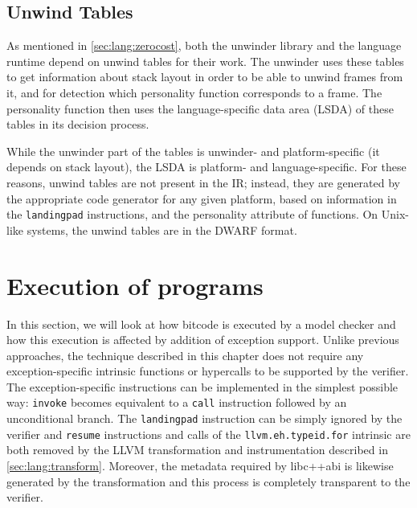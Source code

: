 \subsection{Unwind Tables}\label{sec:lang:unwind-tables}

As mentioned in \autoref{sec:lang:zerocost}, both the unwinder library
and the language runtime depend on unwind tables for their work. The
unwinder uses these tables to get information about stack layout in
order to be able to unwind frames from it, and for detection which
personality function corresponds to a frame. The personality function
then uses the language-specific data area (LSDA) of these tables in its
decision process.

While the unwinder part of the tables is unwinder- and platform-specific
(it depends on stack layout), the LSDA is platform- and
language-specific. For these reasons, unwind tables are not present in
the \llvm{} IR; instead, they are generated by the appropriate code
generator for any given platform, based on information in the
\texttt{landingpad} instructions, and the personality attribute of
functions. On Unix-like systems, the unwind tables are in the
DWARF format.

\section{Execution of \llvm{} programs}\label{sec:execution}

In this section, we will look at how \llvm{} bitcode is executed by a model
checker and how this execution is affected by addition of exception
support. Unlike previous approaches, the technique described in this
chapter does not require any exception-specific intrinsic functions or
hypercalls to be supported by the verifier. The exception-specific \llvm{}
instructions can be implemented in the simplest possible way:
\texttt{invoke} becomes equivalent to a \texttt{call} instruction
followed by an unconditional branch. The \texttt{landingpad} instruction
can be simply ignored by the verifier and \texttt{resume} instructions
and calls of the \texttt{llvm.eh.typeid.for} intrinsic are both removed
by the LLVM transformation and instrumentation described in
\autoref{sec:lang:transform}.
Moreover, the metadata required by libc++abi is likewise
generated by the \llvm{} transformation and this process is completely
transparent to the verifier.

